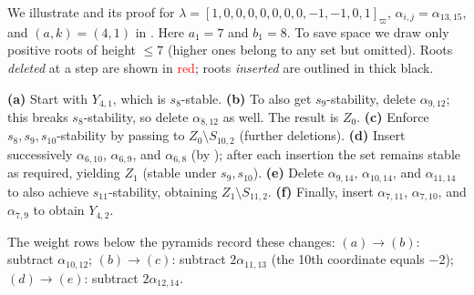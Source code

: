 \begin{example}\rm \label{ejemplo piramides}
We illustrate  and its proof for
$\lambda=[1,0,0,0,0,0,0,0,-1,-1,0,1]_\varpi$, $\alpha_{i,j}=\alpha_{13,15}$, and $(a,k)=(4,1)$ in .
Here $a_{1}=7$ and $b_{1}=8$.
To save space we draw only positive roots of height $\le 7$ (higher ones belong to any set but omitted).
Roots \emph{deleted} at a step are shown in \textcolor{red}{red}; roots \emph{inserted} are outlined in thick black.

\textbf{(a)} Start with $Y_{4,1}$, which is $s_8$-stable.
\textbf{(b)} To also get $s_9$-stability, delete $\alpha_{9,12}$; this breaks $s_8$-stability, so delete $\alpha_{8,12}$ as well. The result is $Z_0$.
\textbf{(c)} Enforce $s_8,s_9,s_{10}$-stability by passing to $Z_0\setminus S_{10,2}$ (further deletions).
\textbf{(d)} Insert successively $\alpha_{6,10}$, $\alpha_{6,9}$, and $\alpha_{6,8}$ (by ); after each insertion the set remains stable as required, yielding $Z_1$ (stable under $s_9,s_{10}$).
\textbf{(e)} Delete $\alpha_{9,14}$, $\alpha_{10,14}$, and $\alpha_{11,14}$ to also achieve $s_{11}$-stability, obtaining $Z_1\setminus S_{11,2}$.
\textbf{(f)} Finally, insert $\alpha_{7,11}$, $\alpha_{7,10}$, and $\alpha_{7,9}$ to obtain $Y_{4,2}$.

The weight rows below the pyramids record these changes:
$(a)\to(b)$: subtract $\alpha_{10,12}$;
$(b)\to(c)$: subtract $2\alpha_{11,13}$ (the 10th coordinate equals $-2$);
$(d)\to(e)$: subtract $2\alpha_{12,14}$.
\end{example}

